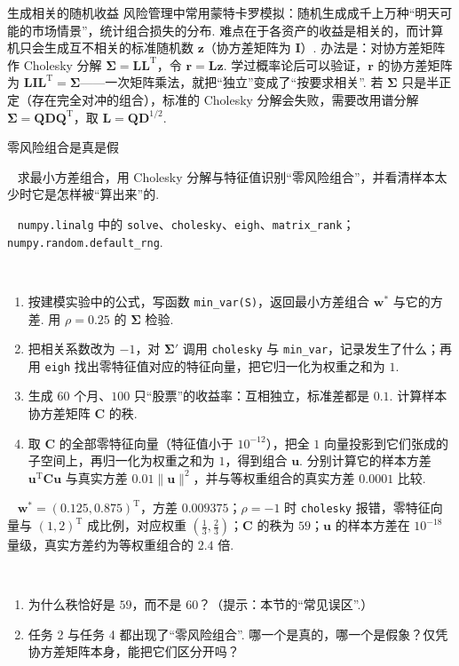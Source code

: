 \documentclass[lang=cn,10.5pt,scheme=chinese,toc=twocol,section,chinesefont=nofont,
twoside,citestyle=gb7714-2015,bibstyle=gb7714-2015]{elegantbook}
\DeclareRobustCommand{\textbf}[1]{{\lnsemiboldlatin\lnsemiboldcjk #1}}
\newcommand{\vv}[1]{\boldsymbol{#1}}
\newcommand{\trans}{\mathrm{T}}             %
\numberwithin{equation}{section}   %
\newcommand{\mstep}[1]{\par\smallskip\noindent\textbf{【#1】}\ }
\begin{document}
\begin{linkbox}{生成相关的随机收益}
  风险管理中常用\textbf{蒙特卡罗模拟}：随机生成成千上万种“明天可能的市场情景”，统计组合损失的分布. 难点在于各资产的收益是相关的，而计算机只会生成\textbf{互不相关}的标准随机数 $\vv z$（协方差矩阵为 $\vv I$）. 办法是：对协方差矩阵作 Cholesky 分解 $\vv\Sigma=\vv L\vv L^\trans$，令 $\vv r=\vv L\vv z$. 学过概率论后可以验证，$\vv r$ 的协方差矩阵为 $\vv L\vv I\vv L^\trans=\vv\Sigma$——一次矩阵乘法，就把“独立”变成了“按要求相关”. 若 $\vv\Sigma$ 只是半正定（存在完全对冲的组合），标准的 Cholesky 分解会失败，需要改用谱分解 $\vv\Sigma=\vv Q\vv D\vv Q^\trans$，取 $\vv L=\vv Q\vv D^{1/2}$.
\end{linkbox}
\begin{codebox}{零风险组合是真是假}
  \mstep{目标} 求最小方差组合，用 Cholesky 分解与特征值识别“零风险组合”，并看清样本太少时它是怎样被“算出来”的.

  \mstep{准备} \texttt{numpy.linalg} 中的 \texttt{solve}、\texttt{cholesky}、\texttt{eigh}、\texttt{matrix\_rank}；\texttt{numpy.random.default\_rng}.

  \mstep{任务}
  \begin{enumerate}
    \item 按建模实验中的公式，写函数 \texttt{min\_var(S)}，返回最小方差组合 $\vv w^*$ 与它的方差. 用 $\rho=0.25$ 的 $\vv\Sigma$ 检验.
    \item 把相关系数改为 $-1$，对 $\vv\Sigma'$ 调用 \texttt{cholesky} 与 \texttt{min\_var}，记录发生了什么；再用 \texttt{eigh} 找出零特征值对应的特征向量，把它归一化为权重之和为 $1$.
    \item 生成 $60$ 个月、$100$ 只“股票”的收益率：互相独立，标准差都是 $0.1$. 计算样本协方差矩阵 $\vv C$ 的秩.
    \item 取 $\vv C$ 的全部零特征向量（特征值小于 $10^{-12}$），把全 $1$ 向量投影到它们张成的子空间上，再归一化为权重之和为 $1$，得到组合 $\vv u$. 分别计算它的样本方差 $\vv u^\trans\vv C\vv u$ 与真实方差 $0.01\|\vv u\|^2$，并与等权重组合的真实方差 $0.0001$ 比较.
  \end{enumerate}

  \mstep{检查点} $\vv w^*=(0.125,0.875)^\trans$，方差 $0.009375$；$\rho=-1$ 时 \texttt{cholesky} 报错，零特征向量与 $(1,2)^\trans$ 成比例，对应权重 $(\frac13,\frac23)$；$\vv C$ 的秩为 $59$；$\vv u$ 的样本方差在 $10^{-18}$ 量级，真实方差约为等权重组合的 $2.4$ 倍.

  \mstep{思考}
  \begin{enumerate}
    \item 为什么秩恰好是 $59$，而不是 $60$？（提示：本节的“常见误区”.）
    \item 任务 2 与任务 4 都出现了“零风险组合”. 哪一个是真的，哪一个是假象？仅凭协方差矩阵本身，能把它们区分开吗？
  \end{enumerate}
\end{codebox}
\newpage
\ExQuadratic
\end{document}
